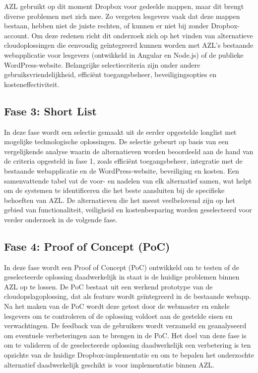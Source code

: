 AZL gebruikt op dit moment Dropbox voor gedeelde mappen, maar dit brengt diverse problemen met zich mee. Zo vergeten lesgevers vaak dat deze mappen bestaan, hebben niet de juiste rechten, of kunnen er niet bij zonder Dropbox-account. Om deze redenen richt dit onderzoek zich op het vinden van alternatieve cloudoplossingen die eenvoudig geïntegreerd kunnen worden met AZL’s bestaande webapplicatie voor lesgevers (ontwikkeld in Angular en Node.js) of de publieke WordPress-website. Belangrijke selectiecriteria zijn onder andere gebruiksvriendelijkheid, efficiënt toegangsbeheer, beveiligingsopties en kosteneffectiviteit.
\subsection{Fase 3: Short List}
In deze fase wordt een selectie gemaakt uit de eerder opgestelde longlist met mogelijke technologische oplossingen. De selectie gebeurt op basis van een vergelijkende analyse waarin de alternatieven worden beoordeeld aan de hand van de criteria opgesteld in fase 1, zoals efficiënt toegangsbeheer, integratie met de bestaande webapplicatie en de WordPress-website, beveiliging en kosten. Een samenvattende tabel vat de voor- en nadelen van elk alternatief samen, wat helpt om de systemen te identificeren die het beste aansluiten bij de specifieke behoeften van AZL. De alternatieven die het meest veelbelovend zijn op het gebied van functionaliteit, veiligheid en kostenbesparing worden geselecteerd voor verder onderzoek in de volgende fase.
\subsection{Fase 4: Proof of Concept (PoC)}
In deze fase wordt een Proof of Concept (PoC) ontwikkeld om te testen of de geselecteerde oplossing daadwerkelijk in staat is de huidige problemen binnen AZL op te lossen. De PoC bestaat uit een werkend prototype van de cloudopslagoplossing, dat als feature wordt geïntegreerd in de bestaande webapp. Na het maken van de PoC wordt deze getest door de webmaster en enkele lesgevers om te controleren of de oplossing voldoet aan de gestelde eisen en verwachtingen. De feedback van de gebruikers wordt verzameld en geanalyseerd om eventuele verbeteringen aan te brengen in de PoC. Het doel van deze fase is om te valideren of de geselecteerde oplossing daadwerkelijk een verbetering is ten opzichte van de huidige Dropbox-implementatie en om te bepalen het onderzochte alternatief daadwerkelijk geschikt is voor implementatie binnen AZL.
